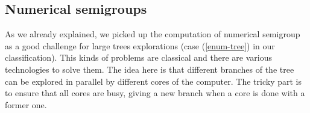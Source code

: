 \documentclass{deliverablereport}
\newcommand{\CilkP}{\texttt{Cilk++}\xspace}
\begin{document}




\subsection{Numerical semigroups}
\label{subsec:numerical-semigroups}

As we already explained, we picked up the computation of numerical semigroup
as a good challenge for large trees explorations (case (\ref{enum-tree}) in our
classification). This kinds of problems are classical and there are various
technologies to solve them. The idea here is that different branches of the
tree can be explored in parallel by different cores of the computer. The
tricky part is to ensure that all cores are busy, giving a new branch when a
core is done with a former one.
\end{document}

